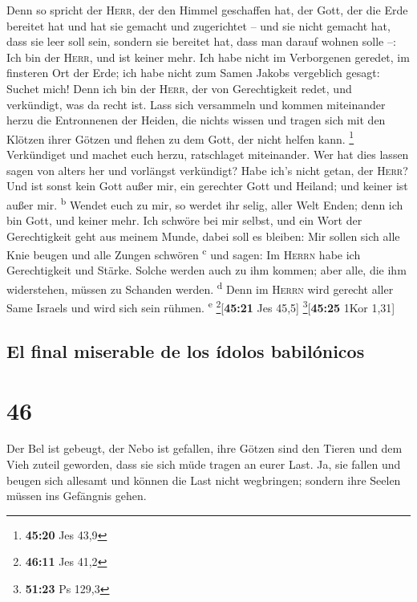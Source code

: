  Denn so spricht der \textsc{Herr}, der den Himmel
geschaffen hat, der Gott, der die Erde bereitet hat und hat sie gemacht
und zugerichtet -- und sie nicht gemacht hat, dass sie leer soll sein,
sondern sie bereitet hat, dass man darauf wohnen solle --: Ich bin der
\textsc{Herr}, und ist keiner mehr.  Ich habe nicht im
Verborgenen geredet, im finsteren Ort der Erde; ich habe nicht zum Samen
Jakobs vergeblich gesagt: Suchet mich! Denn ich bin der \textsc{Herr},
der von Gerechtigkeit redet, und verkündigt, was da recht ist.
 Lass sich versammeln und kommen miteinander herzu die
Entronnenen der Heiden, die nichts wissen und tragen sich mit den
Klötzen ihrer Götzen und flehen zu dem Gott, der nicht helfen kann.
\footnote{\textbf{45:20} Jes 43,9}  Verkündiget und
machet euch herzu, ratschlaget miteinander. Wer hat dies lassen sagen
von alters her und vorlängst verkündigt? Habe ich's nicht getan, der
\textsc{Herr}? Und ist sonst kein Gott außer mir, ein gerechter Gott und
Heiland; und keiner ist außer mir. \textsuperscript{b} 
Wendet euch zu mir, so werdet ihr selig, aller Welt Enden; denn ich bin
Gott, und keiner mehr.  Ich schwöre bei mir selbst, und
ein Wort der Gerechtigkeit geht aus meinem Munde, dabei soll es bleiben:
Mir sollen sich alle Knie beugen und alle Zungen schwören
\textsuperscript{c}  und sagen: Im \textsc{Herrn} habe
ich Gerechtigkeit und Stärke. Solche werden auch zu ihm kommen; aber
alle, die ihm widerstehen, müssen zu Schanden werden.
\textsuperscript{d}  Denn im \textsc{Herrn} wird gerecht
aller Same Israels und wird sich sein rühmen. \textsuperscript{e}
\footnote{\textbf{46:11} Jes 41,2}{[}\textbf{45:21} Jes 45,5{]}
\footnote{\textbf{51:23} Ps 129,3}{[}\textbf{45:25} 1Kor 1,31{]}

\hypertarget{el-final-miserable-de-los-uxeddolos-babiluxf3nicos}{%
\subsection{El final miserable de los ídolos
babilónicos}\label{el-final-miserable-de-los-uxeddolos-babiluxf3nicos}}

\hypertarget{section-45}{%
\section{46}\label{section-45}}

 Der Bel ist gebeugt, der Nebo ist gefallen, ihre Götzen
sind den Tieren und dem Vieh zuteil geworden, dass sie sich müde tragen
an eurer Last.  Ja, sie fallen und beugen sich allesamt
und können die Last nicht wegbringen; sondern ihre Seelen müssen ins
Gefängnis gehen.

